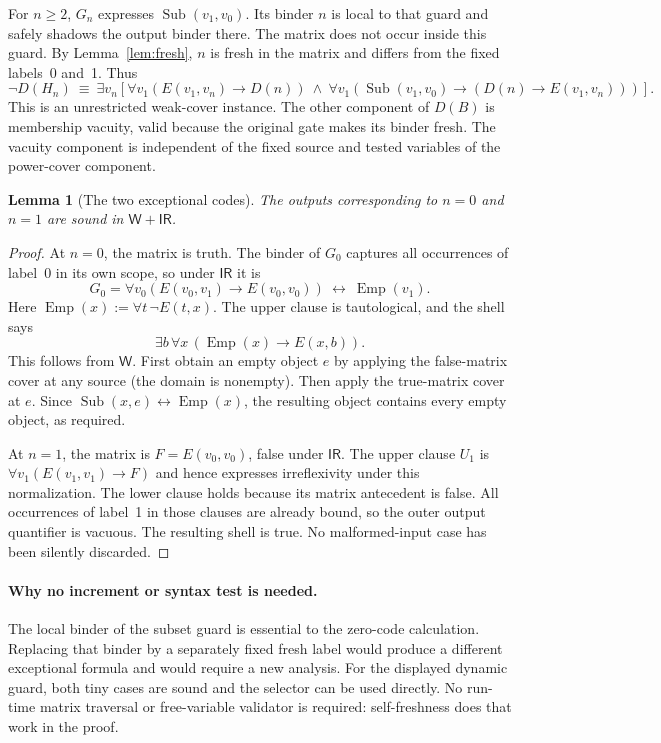 \documentclass[11pt]{article}
\newcommand{\ThW}{\mathsf W}
\newcommand{\IR}{\mathsf{IR}}
\newcommand{\Sub}{\operatorname{Sub}}
\newcommand{\Emp}{\operatorname{Emp}}
\newtheorem{lemma}[theorem]{Lemma}
\theoremstyle{definition}\newtheorem{definition}[theorem]{Definition}
\begin{document}
For $n\ge2$, $G_n$ expresses $\Sub(v_1,v_0)$. Its binder $n$ is local
to that guard and safely shadows the output binder there. The matrix does
not occur inside this guard. By Lemma~\ref{lem:fresh}, $n$ is fresh in
the matrix and differs from the fixed labels~0 and~1. Thus
\begin{equation}\label{eq:shell}
 \neg D(H_n)\ \equiv\ \exists v_n\left[
 \forall v_1(E(v_1,v_n)\to D(n))\ \land\
 \forall v_1(\Sub(v_1,v_0)\to(D(n)\to E(v_1,v_n)))
 \right].
\end{equation}
This is an unrestricted weak-cover instance. The other component of
$D(B)$ is membership vacuity, valid because the original gate makes its
binder fresh. The vacuity component is independent of the fixed source
and tested variables of the power-cover component.

\begin{lemma}[The two exceptional codes]\label{lem:collision}
The outputs corresponding to $n=0$ and $n=1$ are sound in $\ThW+\IR$.
\end{lemma}
\begin{proof}
At $n=0$, the matrix is truth. The binder of $G_0$ captures all
occurrences of label~0 in its own scope, so under $\IR$ it is
\[
 G_0=\forall v_0(E(v_0,v_1)\to E(v_0,v_0))
       \ \leftrightarrow\ \Emp(v_1).
\]
Here $\Emp(x):=\forall t\,\neg E(t,x)$. The upper clause is tautological,
and the shell says
\[
 \exists b\,\forall x\,(\Emp(x)\to E(x,b)).
\]
This follows from $\ThW$. First obtain an empty object $e$ by applying
the false-matrix cover at any source (the domain is nonempty). Then apply
the true-matrix cover at $e$. Since $\Sub(x,e)\leftrightarrow\Emp(x)$,
the resulting object contains every empty object, as required.

At $n=1$, the matrix is $F=E(v_0,v_0)$, false under $\IR$. The upper clause
$U_1$ is $\forall v_1(E(v_1,v_1)\to F)$ and hence expresses
irreflexivity under this normalization. The lower clause holds because
its matrix antecedent is false. All occurrences of label~1 in those
clauses are already bound, so the outer output quantifier is vacuous.
The resulting shell is true. No malformed-input case has been silently
discarded.
\end{proof}

\paragraph{Why no increment or syntax test is needed.}
The local binder of the subset guard is essential to the zero-code
calculation. Replacing that binder by a separately fixed fresh label would
produce a different exceptional formula and would require a new analysis.
For the displayed dynamic guard, both tiny cases are sound and the selector
can be used directly. No run-time matrix traversal or free-variable
validator is required: self-freshness does that work in the proof.
\end{document}
